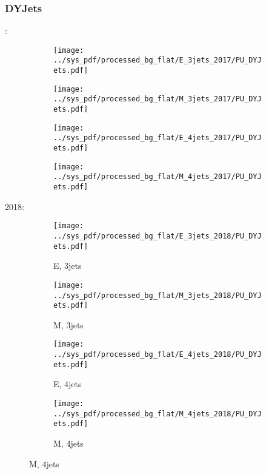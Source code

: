 \documentclass{beamer}
\begin{document}
\begin{frame}
\frametitle{DYJets}
\fontsize{5}{1}:
\begin{figure}
\centering
\begin{subfigure}[b]{0.24\textwidth}
\texttt{[image: ../sys\_pdf/processed\_bg\_flat/E\_3jets\_2017/PU\_DYJets.pdf]}
\end{subfigure}
\begin{subfigure}[b]{0.24\textwidth}
\texttt{[image: ../sys\_pdf/processed\_bg\_flat/M\_3jets\_2017/PU\_DYJets.pdf]}
\end{subfigure}
\begin{subfigure}[b]{0.24\textwidth}
\texttt{[image: ../sys\_pdf/processed\_bg\_flat/E\_4jets\_2017/PU\_DYJets.pdf]}
\end{subfigure}
\begin{subfigure}[b]{0.24\textwidth}
\texttt{[image: ../sys\_pdf/processed\_bg\_flat/M\_4jets\_2017/PU\_DYJets.pdf]}
\end{subfigure}
\end{figure}
2018:
\begin{figure}
\centering
\begin{subfigure}[b]{0.24\textwidth}
\texttt{[image: ../sys\_pdf/processed\_bg\_flat/E\_3jets\_2018/PU\_DYJets.pdf]}
\captionsetup{font=tiny}
\caption{E, 3jets}
\end{subfigure}
\begin{subfigure}[b]{0.24\textwidth}
\texttt{[image: ../sys\_pdf/processed\_bg\_flat/M\_3jets\_2018/PU\_DYJets.pdf]}
\captionsetup{font=tiny}
\caption{M, 3jets}
\end{subfigure}
\begin{subfigure}[b]{0.24\textwidth}
\texttt{[image: ../sys\_pdf/processed\_bg\_flat/E\_4jets\_2018/PU\_DYJets.pdf]}
\captionsetup{font=tiny}
\caption{E, 4jets}
\end{subfigure}
\begin{subfigure}[b]{0.24\textwidth}
\texttt{[image: ../sys\_pdf/processed\_bg\_flat/M\_4jets\_2018/PU\_DYJets.pdf]}
\captionsetup{font=tiny}
\caption{M, 4jets}
\end{subfigure}
\end{figure}
\end{frame}
\end{document}
